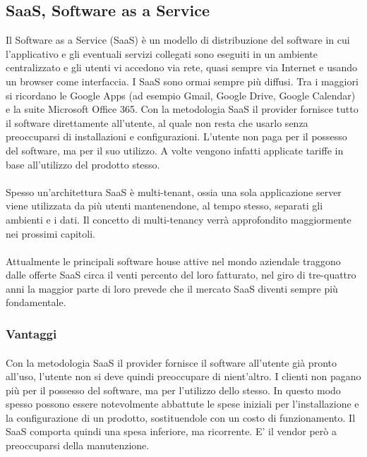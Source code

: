 \subsection{SaaS, Software as a Service}

Il Software as a Service (SaaS) è un modello di distribuzione del software in cui l'applicativo e gli eventuali servizi collegati sono eseguiti in un ambiente centralizzato e gli utenti vi accedono via rete, quasi sempre via Internet e usando un browser come interfaccia. I SaaS sono ormai sempre più diffusi. Tra i maggiori si ricordano le Google Apps (ad esempio Gmail, Google Drive, Google Calendar) e la suite Microsoft Office 365. Con la metodologia SaaS il provider fornisce tutto il software direttamente all'utente, al quale non resta che usarlo senza preoccuparsi di installazioni e configurazioni. L'utente non paga per il possesso del software, ma per il suo utilizzo. A volte vengono infatti applicate tariffe in base all'utilizzo del prodotto stesso. 

\paragraph{}
Spesso un'architettura SaaS è multi-tenant, ossia una sola applicazione server viene utilizzata da più utenti mantenendone, al tempo stesso, separati gli ambienti e i dati. Il concetto di multi-tenancy verrà approfondito maggiormente nei prossimi capitoli.
\paragraph{}
Attualmente le principali software house attive nel mondo aziendale traggono dalle offerte SaaS circa il venti percento del loro fatturato, nel giro di tre-quattro anni la maggior parte di loro prevede che il mercato SaaS diventi sempre più fondamentale.

\subsubsection{Vantaggi}
\paragraph{}
Con la metodologia SaaS il provider fornisce il software all'utente già pronto all'uso, l'utente non si deve quindi preoccupare di nient'altro. I clienti non pagano più per il possesso del software, ma per l'utilizzo dello stesso. In questo modo spesso possono essere notevolmente abbattute le spese iniziali per l'installazione e la configurazione di un prodotto, sostituendole con un costo di funzionamento. Il SaaS comporta quindi una spesa inferiore, ma ricorrente. E' il vendor però a preoccuparsi della manutenzione.
